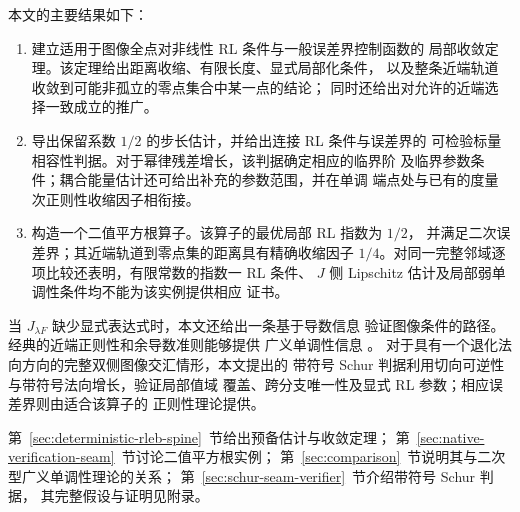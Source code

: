 本文的主要结果如下：
\begin{enumerate}
 \item 建立适用于图像全点对非线性 RL 条件与一般误差界控制函数的
 局部收敛定理。该定理给出距离收缩、有限长度、显式局部化条件，
 以及整条近端轨道收敛到可能非孤立的零点集合中某一点的结论；
 同时还给出对允许的近端选择一致成立的推广。

 \item 导出保留系数 $1/2$ 的步长估计，并给出连接 RL 条件与误差界的
 可检验标量相容性判据。对于幂律残差增长，该判据确定相应的临界阶
 及临界参数条件；耦合能量估计还可给出补充的参数范围，并在单调
 端点处与已有的度量次正则性收缩因子相衔接。

 \item 构造一个二值平方根算子。该算子的最优局部 RL 指数为 $1/2$，
 并满足二次误差界；其近端轨道到零点集的距离具有精确收缩因子
 $1/4$。对同一完整邻域逐项比较还表明，有限常数的指数一 RL 条件、
 $J$ 侧 Lipschitz 估计及局部弱单调性条件均不能为该实例提供相应
 证书。
\end{enumerate}

当 $J_{\lambda F}$ 缺少显式表达式时，本文还给出一条基于导数信息
验证图像条件的路径。经典的近端正则性和余导数准则能够提供
广义单调性信息
\cite{PoliquinRockafellar1996ProxRegular,
ChieuLeeMordukhovichNghia2016CoderivativeMonotonicity}。
对于具有一个退化法向方向的完整双侧图像交汇情形，本文提出的
带符号 Schur 判据利用切向可逆性与带符号法向增长，验证局部值域
覆盖、跨分支唯一性及显式 RL 参数；相应误差界则由适合该算子的
正则性理论提供。

第~\ref{sec:deterministic-rleb-spine}~节给出预备估计与收敛定理；
第~\ref{sec:native-verification-seam}~节讨论二值平方根实例；
第~\ref{sec:comparison}~节说明其与二次型广义单调性理论的关系；
第~\ref{sec:schur-seam-verifier}~节介绍带符号 Schur 判据，
其完整假设与证明见附录。
